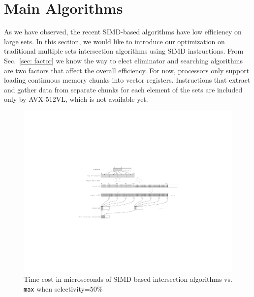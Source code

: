 \documentclass[runningheads,a4paper]{llncs}
\begin{document}
\section{Main Algorithms}
As we have observed, the recent SIMD-based algorithms have low efficiency on large sets.
In this section, we would like to introduce our optimization on traditional multiple sets intersection algorithms using SIMD instructions.
From Sec.~\ref{sec: factor} we know the way to elect eliminator and searching algorithms are two factors that affect the overall efficiency.
For now, processors only support loading continuous memory chunks into vector registers.
Instructions that extract and gather data from separate chunks for each element of the sets are included only by AVX-512VL, which is not available yet.
\begin{figure}
	\centering
	\includegraphics[width=1.0\linewidth]{simd_me}
	\caption{Time cost in microseconds of SIMD-based intersection algorithms vs. \texttt{max} when selectivity=50\%}
	\label{fig: simd_me}
\end{figure}
\end{document}
